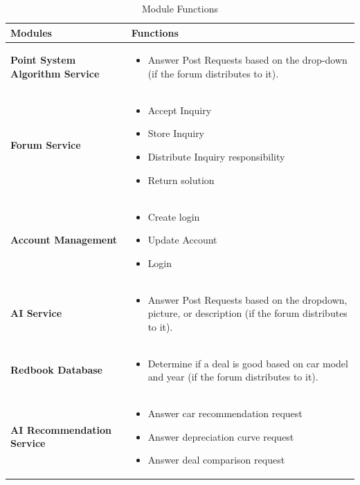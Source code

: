 \documentclass[]{article}
\begin{document}
	\begin{table}[h!]
		\centering
		\renewcommand{\arraystretch}{1.5}
		\begin{tabular}{|p{4cm}|p{10cm}|}
			\hline
			\textbf{Modules} & \textbf{Functions} \\
			\hline
			\textbf{Point System Algorithm Service} & 
            \begin{itemize}
                \item Answer Post Requests based on the drop-down (if the forum distributes to it).
            \end{itemize} \\
			\hline
			\textbf{Forum Service} & 
			\begin{itemize}
				\item Accept Inquiry
				\item Store Inquiry
				\item Distribute Inquiry responsibility
				\item Return solution
			\end{itemize} \\
			\hline
			\textbf{Account Management} & 
			\begin{itemize}
				\item Create login
				\item Update Account
				\item Login
			\end{itemize} \\
			\hline
			\textbf{AI Service} &
            \begin{itemize}
                \item Answer Post Requests based on the dropdown, picture, or description (if the forum distributes to it).
            \end{itemize} \\
			\hline
			\textbf{Redbook Database} & 
            \begin{itemize}
                \item Determine if a deal is good based on car model and year (if the forum distributes to it).
            \end{itemize} \\
			\hline
			\textbf{AI Recommendation Service} & 
			\begin{itemize}
				\item Answer car recommendation request
				\item Answer depreciation curve request
				\item Answer deal comparison request
			\end{itemize} \\
			\hline
		\end{tabular}
		\caption{Module Functions}
		\label{tab:module_functions}
	\end{table}
        \FloatBarrier
\pagebreak
\end{document}
